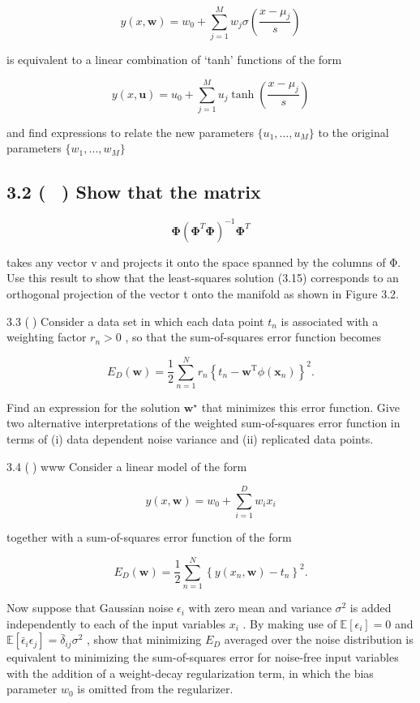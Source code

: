 \documentclass[
  10
]{article}
\begin{document}
\[
y (x, \mathbf {w}) = w _ {0} + \sum_ {j = 1} ^ {M} w _ {j} \sigma \left(\frac {x - \mu_ {j}}{s}\right)\tag{3.101}
\]

is equivalent to a linear combination of `tanh' functions of the form

\[
y (x, \mathbf {u}) = u _ {0} + \sum_ {j = 1} ^ {M} u _ {j} \tanh \left(\frac {x - \mu_ {j}}{s}\right)\tag{3.102}
\]

and find expressions to relate the new parameters
\(\{ u _ { 1 } , . . . , u _ { M } \}\) to the original parameters
\(\{ w _ { 1 } , \hdots , w _ { M } \}\)

\subsection{3.2 ( ) Show that the matrix}\label{show-that-the-matrix}

\[
\boldsymbol {\Phi} \left(\boldsymbol {\Phi} ^ {T} \boldsymbol {\Phi}\right) ^ {- 1} \boldsymbol {\Phi} ^ {T}\tag{3.103}
\]

takes any vector v and projects it onto the space spanned by the columns
of Φ. Use this result to show that the least-squares solution (3.15)
corresponds to an orthogonal projection of the vector t onto the
manifold as shown in Figure 3.2.

3.3 () Consider a data set in which each data point \(t _ { n }\) is
associated with a weighting factor \(r _ { n } > 0\) , so that the
sum-of-squares error function becomes

\[
E _ {D} (\mathbf {w}) = \frac {1}{2} \sum_ {n = 1} ^ {N} r _ {n} \left\{t _ {n} - \mathbf {w} ^ {\mathrm{T}} \phi (\mathbf {x} _ {n}) \right\} ^ {2}.\tag{3.104}
\]

Find an expression for the solution \(\mathbf { w } ^ { \star }\) that
minimizes this error function. Give two alternative interpretations of
the weighted sum-of-squares error function in terms of (i) data
dependent noise variance and (ii) replicated data points.

3.4 () www Consider a linear model of the form

\[
y (x, \mathbf {w}) = w _ {0} + \sum_ {i = 1} ^ {D} w _ {i} x _ {i}\tag{3.105}
\]

together with a sum-of-squares error function of the form

\[
E _ {D} (\mathbf {w}) = \frac {1}{2} \sum_ {n = 1} ^ {N} \left\{y (x _ {n}, \mathbf {w}) - t _ {n} \right\} ^ {2}.\tag{3.106}
\]

Now suppose that Gaussian noise \(\epsilon _ { i }\) with zero mean and
variance \(\sigma ^ { 2 }\) is added independently to each of the input
variables \(x _ { i }\) . By making use of
\(\mathbb { E } [ \epsilon _ { i } ] = 0\) and
\(\mathbb { E } [ \mathsf { \bar { \epsilon } } _ { i } \epsilon _ { j } ] = \mathsf { \bar { \delta } } _ { i j } \sigma ^ { 2 }\)
, show that minimizing \(E _ { D }\) averaged over the noise
distribution is equivalent to minimizing the sum-of-squares error for
noise-free input variables with the addition of a weight-decay
regularization term, in which the bias parameter \(w _ { 0 }\) is
omitted from the regularizer.
\end{document}
